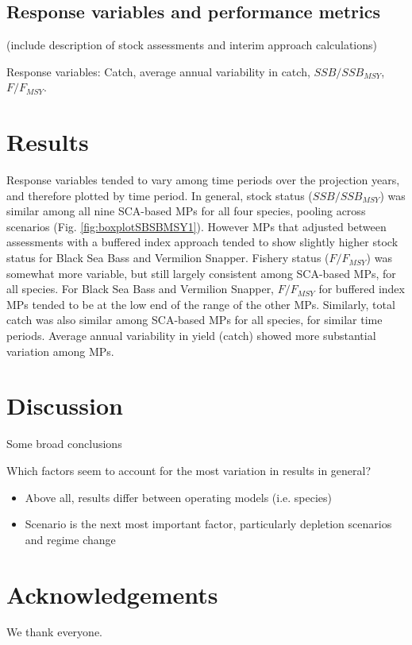 \documentclass[12pt,english]{article}
\begin{document}
\begin{flushleft}
\begin{spacing}{1.9}
\subsection*{Response variables and performance metrics}

(include description of stock assessments and interim approach calculations)

Response variables: Catch, average annual variability in catch, $SSB/SSB_{MSY}$, $F/F_{MSY}$.

\section*{Results}

Response variables tended to vary among time periods over the projection years, and therefore plotted by time period.
In general, stock status ($SSB/SSB_{MSY}$) was similar among all nine SCA-based MPs for all four species, pooling across scenarios (Fig. \ref{fig:boxplotSBSBMSY1}). However MPs that adjusted between assessments with a buffered index approach tended to show slightly higher stock status for Black Sea Bass and Vermilion Snapper. Fishery status ($F/F_{MSY}$) was somewhat more variable, but still largely consistent among SCA-based MPs, for all species. For Black Sea Bass and Vermilion Snapper, $F/F_{MSY}$ for buffered index MPs tended to be at the low end of the range of the other MPs. Similarly, total catch was also similar among SCA-based MPs for all species, for similar time periods. Average annual variability in yield (catch) showed more substantial variation among MPs.


\section*{Discussion}

Some broad conclusions

Which factors seem to account for the most variation in results in general?
\begin{itemize}
\item Above all, results differ between operating models (i.e. species)
\item Scenario is the next most important factor, particularly depletion scenarios and regime change
\end{itemize}

\section*{Acknowledgements}
We thank everyone.

\end{spacing}
\end{flushleft}
\end{document}
